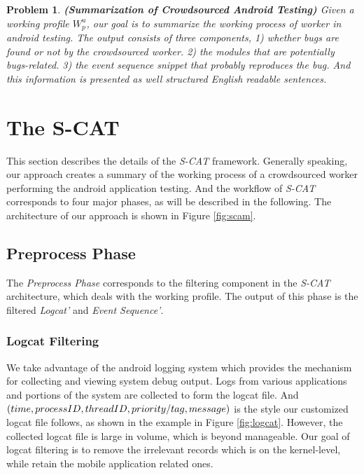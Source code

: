 \documentclass[10pt,conference]{IEEEtran}
\begin{document}
\newtheorem{problem}{Problem}
\begin{problem} \textbf{(Summarization of Crowdsourced Android Testing)}
Given a working profile $W^{u}_p$, our goal is to summarize the working process of worker in android testing.
The output consists of three components, 1) whether bugs are found or not by the crowdsourced worker. 2) the modules that
are potentially bugs-related. 3) the event sequence snippet that probably reproduces the bug. And this information is presented as
well structured English readable sentences.
\end{problem}

\section{The S-CAT}\label{s-cam}

This section describes the details of the \emph{S-CAT} framework.
Generally speaking, our approach creates a summary of the working process of a crowdsourced worker performing
the android  application testing. And the workflow of \emph{S-CAT} corresponds to four major phases, as will be described
in the following. The architecture of our approach is shown in Figure \ref{fig:scam}. 

\subsection{Preprocess Phase}

The \emph{Preprocess Phase} corresponds to the filtering component in the \emph{S-CAT} architecture, which deals
with the working profile. The output of this phase is the filtered \emph{Logcat'} and \emph{Event Sequence'}.

\subsubsection{Logcat Filtering}
We take advantage of the android logging system which provides the mechanism for collecting and viewing system debug
output. Logs from various applications and portions of the system are collected to form the logcat file.
And $(time, processID, threadID,\\priority/tag, message)$ is the style our customized logcat file follows,
as shown in the example in Figure \ref{fig:logcat}. However, the collected logcat file is large in volume, which
is beyond manageable. Our goal of logcat filtering is to remove the irrelevant records which is on the kernel-level,
while retain the mobile application related ones.
\end{document}
